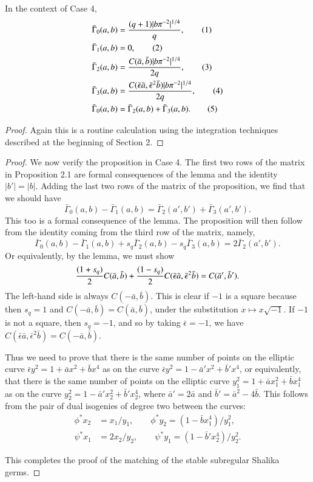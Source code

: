\documentclass{amsart}
\newcommand\bGamma{\bar\Gamma}
\newenvironment{cthm}[1]
  {\renewcommand\thethm{\bf #1}\thm}
  {\endthm}
\begin{document}
\smallskip
\noindent
\begin{cthm}{Lemma 2.8} In the context of Case 4,
\begin{align*}
\bGamma_0(a,b) &= {(q+1)|b\pi^{-2}|^{1/4} \over q},\tag{1} \\
\bGamma_1(a,b) &= 0,\tag{2}\\
\bGamma_2(a,b) &= {C(\bar a,\bar b)|b\pi^{-2}|^{1/4} \over 2q},\tag{3} \\
\bGamma_3(a,b) &= {C(\bar \epsilon\bar a,\bar\epsilon^2
 			\bar b)|b\pi^{-2}|^{1/4} \over 2q},\tag{4} \\
\bGamma_0(a,b) &= \bGamma_2(a,b)+\bGamma_3(a,b).\tag{5}
\end{align*}
\end{cthm}

\smallskip
\noindent
\begin{proof}
Again this is a routine calculation using the integration techniques
described at the beginning of Section 2.
\end{proof}

\begin{proof}
We now verify the proposition in Case 4.
The first two rows of the matrix
in Proposition 2.1 are formal consequences of the lemma
and the identity $|b'|=|b|$.  Adding the last
two rows of the matrix of the proposition, 
we find that we should have
$$\bGamma_0(a,b) -\bGamma_1(a,b) = \bGamma_2(a',b') +\bGamma_3(a',b').$$
This too is a formal consequence of the lemma.
The proposition will then follow from the identity coming
from the third row of the matrix, namely,
$$\bGamma_0(a,b) -\bGamma_1(a,b) + s_q\bGamma_2(a,b) - s_q\bGamma_3(a,b)
	= 2\bGamma_2(a',b').$$
Or equivalently, by the lemma, we must show
$$
{(1+s_q)\over 2} C(\bar a,\bar b) + {(1-s_q)\over 2} C(\bar \epsilon 
\bar a,\bar \epsilon^2\bar b) = C(\bar a',\bar b').$$
The left-hand side is always $C(-\bar a,\bar b)$.  This is clear
if $-1$ is a square because then $s_q=1$ and $C(-\bar a,\bar b)=
C(\bar a,\bar b)$, under the substitution $x\mapsto x\sqrt{-1}$.
If $-1$ is not a square, then $s_q=-1$, and so by taking $\bar\epsilon=-1$,
we have $C(\bar\epsilon\bar a,\bar\epsilon^2\bar b) = C(-\bar a,\bar b)$.

Thus we need to prove that there is the same number of points
on the elliptic curve $\bar\epsilon y^2= 1+\bar a x^2 + \bar b x^4$ as
on the curve $\bar \epsilon y^2 = 1-\bar a'x^2 + \bar b' x^4$,
or equivalently, that there is the same number of points on the
elliptic curve $y_1^2 = 1+\bar a x_1^2 + \bar b x_1^4$ as on the
curve $y_2^2 = 1 - \bar a' x_2^2 + \bar b' x_2^4$, where $\bar a'=2\bar a$
and $\bar b' = \bar a^2 - 4\bar b$.  This follows from the pair
of dual isogenies of degree two between the curves:
\begin{align*}
\phi^*x_2 &= x_1/y_1,\qquad \phi^* y_2 = (1-\bar b x_1^4)/y_1^2,\\
\psi^*x_1 &= 2x_2/y_2,\qquad \psi^*y_1 = (1-\bar b' x_2^4)/y_2^2.
\end{align*}

This completes the proof of the matching of the stable subregular Shalika
germs.\end{proof}
\end{document}
